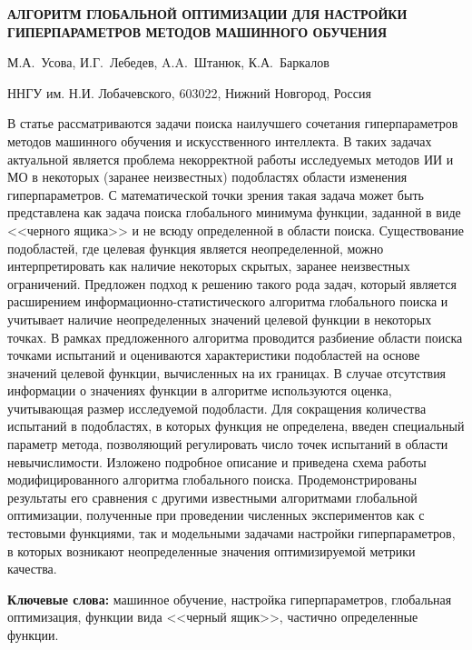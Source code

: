 \documentclass[a4paper,12pt,russian]{article}
\begin{document}
\begin{center}
	\textbf{АЛГОРИТМ ГЛОБАЛЬНОЙ ОПТИМИЗАЦИИ ДЛЯ НАСТРОЙКИ ГИПЕРПАРАМЕТРОВ МЕТОДОВ МАШИННОГО ОБУЧЕНИЯ}
\end{center}

\begin{center}
	{М.А.~Усова, И.Г.~Лебедев, A.A.~Штанюк, К.А.~Баркалов }
\end{center}

\begin{center}
{ННГУ им. Н.И. Лобачевского, 603022, Нижний Новгород, Россия}
\end{center}

\newline
\begin{small}
В статье рассматриваются задачи поиска наилучшего сочетания гиперпараметров методов машинного обучения и искусственного интеллекта. 
В таких задачах актуальной является проблема некорректной работы исследуемых методов ИИ и МО в некоторых (заранее неизвестных) подобластях области изменения гиперпараметров. 
С математической точки зрения такая задача может быть представлена как задача поиска глобального минимума функции, заданной в виде <<черного ящика>> и не всюду определенной в области поиска. 
Существование подобластей, где целевая функция является неопределенной, можно интерпретировать как наличие некоторых скрытых, заранее неизвестных ограничений. Предложен подход к решению такого рода задач, который является расширением информационно-статистического алгоритма глобального поиска и учитывает наличие неопределенных значений целевой функции в некоторых точках. 
В рамках предложенного алгоритма проводится разбиение области поиска точками испытаний и оцениваются характеристики подобластей на основе значений целевой функции, вычисленных на их границах. 
В случае отсутствия информации о значениях функции в алгоритме используются оценка, учитывающая размер исследуемой подобласти. 
Для сокращения количества испытаний в подобластях, в которых функция не определена, введен специальный параметр метода, позволяющий регулировать число точек испытаний в области невычислимости. Изложено подробное описание и приведена схема работы модифицированного алгоритма глобального поиска. Продемонстрированы результаты его сравнения с другими известными алгоритмами глобальной оптимизации, полученные при проведении численных экспериментов как с тестовыми функциями, так и модельными задачами настройки гиперпараметров, в которых возникают неопределенные значения оптимизируемой метрики качества. 


\textbf{Ключевые слова:} машинное обучение, настройка гиперпараметров, глобальная оптимизация, функции вида <<черный ящик>>, частично определенные функции.
\end{small}
\end{document}
